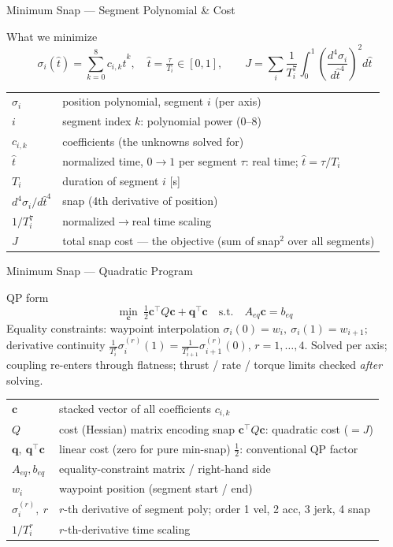 \documentclass[aspectratio=169,11pt]{beamer}
\begin{document}
\begin{frame}{Minimum Snap --- Segment Polynomial \& Cost}
\begin{block}{What we minimize}
\[
\sigma_i(\hat t)=\sum_{k=0}^{8}c_{i,k}\hat t^k,\quad \hat t=\tfrac{\tau}{T_i}\in[0,1],
\qquad
J=\sum_i \frac{1}{T_i^{7}}\int_0^1\!\left(\frac{d^4\sigma_i}{d\hat t^{4}}\right)^{2} d\hat t
\]
\end{block}
\vspace{0.2cm}
{\footnotesize
\begin{tabular}{@{}ll@{}}
\(\sigma_i\) & position polynomial, segment \(i\) (per axis) \\
\(i\) & segment index \qquad\qquad \(k\): polynomial power (0--8) \\
\(c_{i,k}\) & coefficients (the unknowns solved for) \\
\(\hat t\) & normalized time, \(0\to1\) per segment \qquad \(\tau\): real time; \(\hat t=\tau/T_i\) \\
\(T_i\) & duration of segment \(i\) [s] \\
\(d^4\sigma_i/d\hat t^4\) & snap (4th derivative of position) \\
\(1/T_i^{7}\) & normalized\(\to\)real time scaling \\
\(J\) & total snap cost --- the objective (sum of snap\(^2\) over all segments) \\
\end{tabular}}
\end{frame}

\begin{frame}{Minimum Snap --- Quadratic Program}
\begin{block}{QP form}
\[
\min_{\mathbf c}\ \tfrac{1}{2}\mathbf c^\top Q\mathbf c+\mathbf q^\top\mathbf c
\quad\text{s.t.}\quad
A_{eq}\mathbf c=b_{eq}
\]
\small Equality constraints: waypoint interpolation \(\sigma_i(0)=w_i,\ \sigma_i(1)=w_{i+1}\); derivative continuity \(\tfrac{1}{T_i^r}\sigma_i^{(r)}(1)=\tfrac{1}{T_{i+1}^r}\sigma_{i+1}^{(r)}(0)\), \(r=1,\dots,4\). Solved per axis; coupling re-enters through flatness; thrust / rate / torque limits checked \emph{after} solving.
\end{block}
\vspace{0.1cm}
{\footnotesize
\begin{tabular}{@{}ll@{}}
\(\mathbf c\) & stacked vector of all coefficients \(c_{i,k}\) \\
\(Q\) & cost (Hessian) matrix encoding snap \qquad \(\mathbf c^\top Q\mathbf c\): quadratic cost (\(=J\)) \\
\(\mathbf q,\ \mathbf q^\top\mathbf c\) & linear cost (zero for pure min-snap) \qquad \(\tfrac12\): conventional QP factor \\
\(A_{eq},b_{eq}\) & equality-constraint matrix / right-hand side \\
\(w_i\) & waypoint position (segment start / end) \\
\(\sigma_i^{(r)},\ r\) & \(r\)-th derivative of segment poly; order 1 vel, 2 acc, 3 jerk, 4 snap \\
\(1/T_i^{r}\) & \(r\)-th-derivative time scaling \\
\end{tabular}}
\end{frame}
\end{document}
